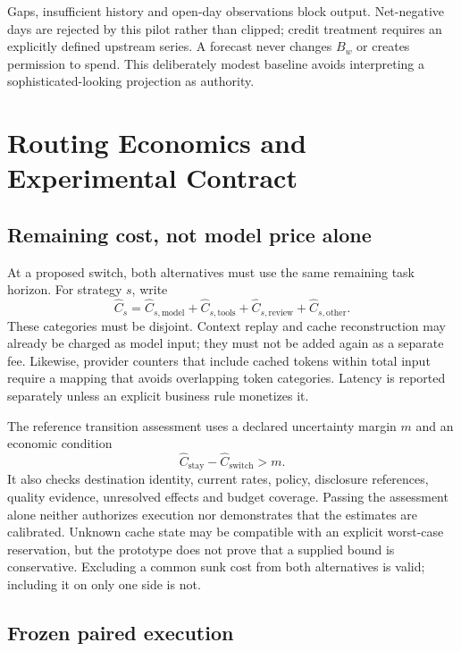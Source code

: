 \documentclass[10pt,twocolumn]{article}
\begin{document}
Gaps, insufficient history and open-day observations block output. Net-negative days are rejected by this pilot rather than clipped; credit treatment requires an explicitly defined upstream series. A forecast never changes $B_w$ or creates permission to spend. This deliberately modest baseline avoids interpreting a sophisticated-looking projection as authority.

\section{Routing Economics and Experimental Contract}
\label{sec:routing}

\subsection{Remaining cost, not model price alone}

At a proposed switch, both alternatives must use the same remaining task horizon. For strategy $s$, write
\begin{equation}
\widehat C_s=\widehat C_{s,\mathrm{model}}+
\widehat C_{s,\mathrm{tools}}+
\widehat C_{s,\mathrm{review}}+
\widehat C_{s,\mathrm{other}}.
\label{eq:fullcost}
\end{equation}
These categories must be disjoint. Context replay and cache reconstruction may already be charged as model input; they must not be added again as a separate fee. Likewise, provider counters that include cached tokens within total input require a mapping that avoids overlapping token categories. Latency is reported separately unless an explicit business rule monetizes it.

The reference transition assessment uses a declared uncertainty margin $m$ and an economic condition
\begin{equation}
\widehat C_{\mathrm{stay}}-\widehat C_{\mathrm{switch}}>m.
\end{equation}
It also checks destination identity, current rates, policy, disclosure references, quality evidence, unresolved effects and budget coverage. Passing the assessment alone neither authorizes execution nor demonstrates that the estimates are calibrated. Unknown cache state may be compatible with an explicit worst-case reservation, but the prototype does not prove that a supplied bound is conservative. Excluding a common sunk cost from both alternatives is valid; including it on only one side is not.

\subsection{Frozen paired execution}
\end{document}

